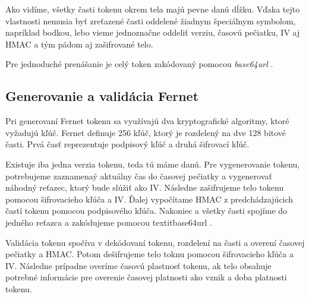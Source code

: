 Ako vidíme, všetky časti tokenu okrem tela majú pevne danú dĺžku. Vďaka tejto vlastnosti nemusia byť zreťazené časti oddelené žiadnym špeciálnym symbolom, napríklad bodkou, lebo vieme jednoznačne oddeliť verziu, časovú pečiatku, IV aj HMAC a tým pádom aj zašifrované telo.

Pre jednoduché prenášanie je celý token zakódovaný pomocou \textit{base64url} \cite{base64_rfc}.

\subsection{Generovanie a validácia Fernet}

Pri generovaní Fernet tokenu sa využívajú dva kryptografické algoritmy, ktoré vyžadujú kľúč. Fernet definuje 256 kľúč, ktorý je rozdelený na dve 128 bitové časti. Prvá časť reprezentuje podpisový kľúč a druhá šifrovací kľúč.

Existuje iba jedna verzia tokenu, teda tú máme danú. Pre vygenerovanie tokenu, potrebujeme zaznamenaý aktuálny čas do časovej pečiatky a vygenerovať náhodný reťazec, ktorý bude slúžiť ako IV. Následne zašifrujeme telo tokenu pomocou šifrovacieho kľúča a IV. Ďalej vypočítame HMAC z predchádzajúcich častí tokenu pomocou podpisového kľúča. Nakoniec a všetky časti spojíme do jedného reťazca a zakódujeme pomocou textit{base64url} \cite{base64_rfc}.

Validácia tokenu spočíva v dekódovaní tokenu, rozdelení na časti a overení časovej pečiatky a HMAC. Potom dešifrujeme telo toknu pomocou šifrovacieho kľúča a IV. Následne prípadne overíme časovú plastnosť tokenu, ak telo obsahuje potrebné informácie pre overenie časovej platnosti ako vznik a doba platnosti tokenu.